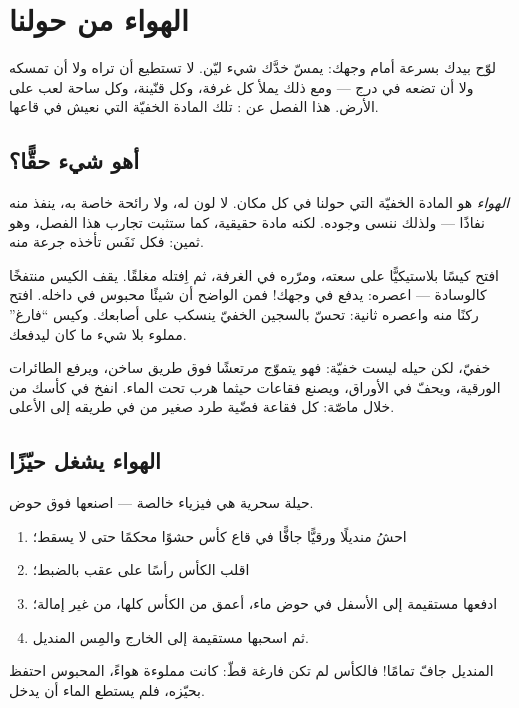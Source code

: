 \chapter{الهواء من حولنا}\label{ch:g2:air-around-us}

لوّح بيدك بسرعة أمام وجهك: يمسّ خدَّك شيء ليّن. لا تستطيع أن تراه
ولا أن تمسكه ولا أن تضعه في درج --- ومع ذلك يملأ كل غرفة، وكل
قنّينة، وكل ساحة لعب على الأرض. هذا الفصل عن : تلك المادة
الخفيّة التي نعيش في قاعها.

\section{أهو شيء حقًّا؟}

\begin{definition}[الهواء]\label{def:g2:air-around-us:air}
\emph{الهواء} هو المادة الخفيّة التي حولنا في كل مكان.
لا لون له، ولا رائحة خاصة به،  ينفذ منه نفاذًا --- ولذلك
ننسى وجوده. لكنه مادة حقيقية، كما ستثبت تجارب هذا الفصل، وهو
ثمين: فكل نَفَس تأخذه جرعة منه.
\end{definition}

\begin{example}\label{ex:g2:air-around-us:catch}
افتح كيسًا بلاستيكيًّا على سعته، ومرّره في الغرفة، ثم اِفتله
مغلقًا. يقف الكيس منتفخًا كالوسادة --- اعصره: يدفع في وجهك! فمن
الواضح أن شيئًا محبوس في داخله. افتح ركنًا منه واعصره ثانية: تحسّ
بالسجين الخفيّ ينسكب على أصابعك. وكيس ``فارغ'' مملوء بلا شيء ما
كان ليدفعك.
\end{example}

\begin{example}\label{ex:g2:air-around-us:shows}
 خفيّ، لكن حيله ليست خفيّة: فهو يتموّج مرتعشًا فوق طريق
ساخن، ويرفع الطائرات الورقية، ويحفّ في الأوراق، ويصنع فقاعات
حيثما هرب تحت الماء. انفخ في كأسك من خلال ماصّة: كل فقاعة فضّية
طرد صغير من  في طريقه إلى الأعلى.
\end{example}

\section{الهواء يشغل حيّزًا}

\begin{method}\label{met:g2:air-around-us:drytowel}
حيلة سحرية هي فيزياء خالصة --- اصنعها فوق حوض.
\begin{enumerate}
  \item احشُ منديلًا ورقيًّا جافًّا في قاع كأس حشوًا محكمًا حتى
        لا يسقط؛
  \item اقلب الكأس رأسًا على عقب بالضبط؛
  \item ادفعها مستقيمة إلى الأسفل في حوض ماء، أعمق من الكأس
        كلها، من غير إمالة؛
  \item ثم اسحبها مستقيمة إلى الخارج والمِس المنديل.
\end{enumerate}
المنديل جافّ تمامًا! فالكأس لم تكن فارغة قطّ: كانت مملوءة هواءً،
 المحبوس احتفظ بحيّزه، فلم يستطع الماء أن يدخل.
\end{method}

